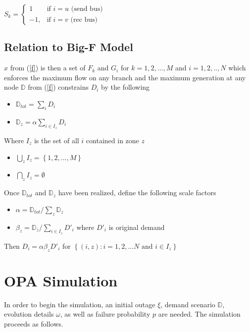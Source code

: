 \centerline{
 $S_k = 
 \left\{ 
	\begin{array}{lr}
				1 & \mbox{if } i = u \mbox{ (send bus)} \\
			 -1, & \mbox{if } i = v \mbox{ (rec bus)}
	\end{array}
 \right. $ }
 
 
 \subsection{Relation to Big-F Model}
 $x$ from (\ref{f}) is then a set of $F_k$ and $G_i$ for $k = 1,2,...,M$ and $i = 1,2,..,N$ which enforces the maximum flow on any branch and the maximum generation at any node \newline 
 \newline
  $\mathbb{D}$ from (\ref{f}) constrains $D_i$ by the following
 \begin{itemize}
 \item  $\mathbb{D}_{tot} = \sum_i D_i $ 
 \item $\mathbb{D}_{z} = \alpha \sum_{i \in I_z} D_i $
 \end{itemize}
 Where \newline
 $I_z$ is the set of all $i$ contained in zone $z$
 \begin{itemize}
 \item $\bigcup_z I_z = \left\{ 1, 2, ..., M \right\}$
 \item $\bigcap_z I_z = \emptyset $ 
 \end{itemize}
 Once $\mathbb{D}_{tot}$ and $\mathbb{D}_z$ have been realized, define the following scale factors
 
\begin{itemize}
 \item  $\alpha = \mathbb{D}_{tot} / \sum_z \mathbb{D}_z $
 \item $\beta_z = \mathbb{D}_z / \sum_{i \in I_z} D'_i $ where $D'_i$ is original demand \newline
 \end{itemize}
  Then \newline
  $ D_i = \alpha \beta_z D'_i $  for $ \left\{ (i,z) : i=1,2,...N \mbox{ and } i \in I_z \right\}$ 

		

\section{OPA Simulation}\label{opa}
In order to begin the simulation, an initial outage $\xi$, demand scenario $\mathbb{D}$, evolution details $\omega$, as well as failure probability $p$ are needed.  The simulation proceeds as follows.  \newline

